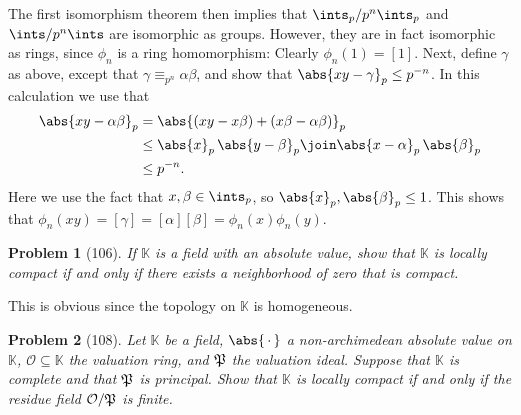 \documentclass[a4paper, 11pt]{memoir}
\theoremstyle{plaincustomnumber}
\newtheorem{problem}{Problem}
\theoremstyle{changedotbreakcustomnumber}
\newcommand{\calO}{\mathcal{O}}
\newcommand{\fieldK}{\mathbb{K}}
\begin{document}
\begin{solution}
    The first isomorphism theorem then implies that $\ints_p / p^n \ints_p$ and $\ints / p^n \ints$ are isomorphic as groups. However, they are in fact isomorphic as rings, since $\phi_n$ is a ring homomorphism: Clearly $\phi_n(1) = [1]$. Next, define $\gamma$ as above, except that $\gamma \equiv_{p^n} \alpha\beta$, and show that $\abs{xy - \gamma}_p \leq p^{-n}$. In this calculation we use that
    \begin{align*}
        \abs{xy - \alpha\beta}_p
            &= \abs{(xy - x\beta) + (x\beta - \alpha\beta)}_p \\
            &\leq \abs{x}_p \, \abs{y - \beta}_p \join \abs{x - \alpha}_p \, \abs{\beta}_p \\
            &\leq p^{-n}.
    \end{align*}
    Here we use the fact that $x,\beta \in \ints_p$, so $\abs{x}_p, \abs{\beta}_p \leq 1$. This shows that $\phi_n(xy) = [\gamma] = [\alpha][\beta] = \phi_n(x)\phi_n(y)$.
\end{solution}


\begin{problem}[106]
    If $\fieldK$ is a field with an absolute value, show that $\fieldK$ is locally compact if and only if there exists a neighborhood of zero that is compact.
\end{problem}

\begin{solution}
    This is obvious since the topology on $\fieldK$ is homogeneous.
\end{solution}


\begin{problem}[108]
    Let $\fieldK$ be a field, $\abs{\,\cdot\,}$ a non-archimedean absolute value on $\fieldK$, $\calO \subseteq \fieldK$ the valuation ring, and $\mathfrak{P}$ the valuation ideal. Suppose that $\fieldK$ is complete and that $\mathfrak{P}$ is principal. Show that $\fieldK$ is locally compact if and only if the residue field $\calO/\frakP$ is finite.
\end{problem}
\end{document}
